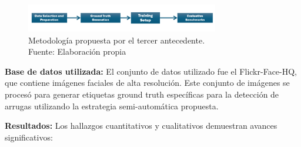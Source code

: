 \begin{enumerate}[label=\textbf{\arabic*.}, leftmargin=2em]
	\begin{figure}[H]
		\begin{center}
			\includegraphics[width=0.75\textwidth]{2/figures/metoant3.png}
			\caption[Metodología propuesta por el tercer antecedente]{Metodología propuesta por el tercer antecedente.\\
				Fuente: Elaboración propia}
			\label{2:figant3}
		\end{center}
	\end{figure}
\end{enumerate}

\textbf{Base de datos utilizada:}
El conjunto de datos utilizado fue el Flickr-Face-HQ, que contiene imágenes faciales de alta resolución. Este conjunto de imágenes se procesó para generar etiquetas ground truth específicas para la detección de arrugas utilizando la estrategia semi-automática propuesta.

\textbf{Resultados:}
Los hallazgos cuantitativos y cualitativos demuestran avances significativos:

